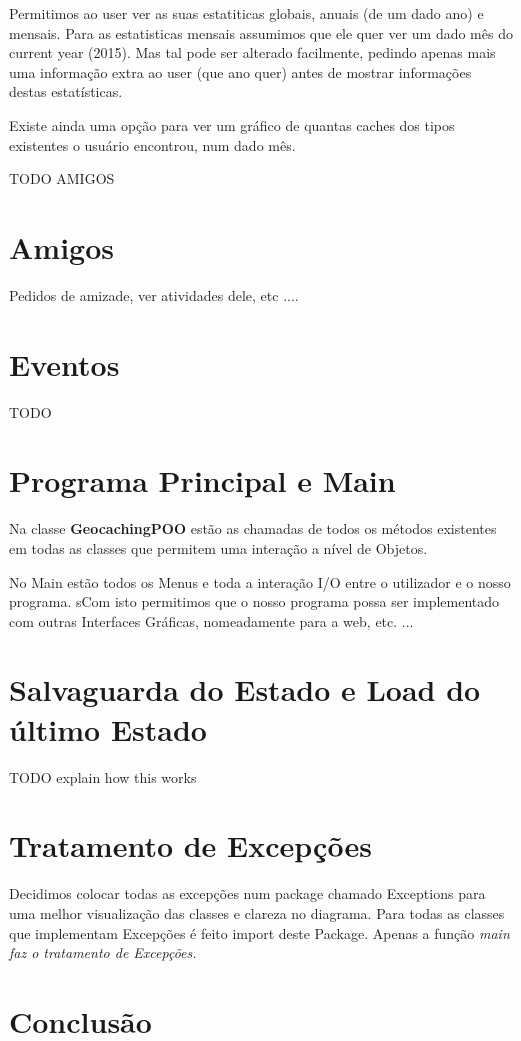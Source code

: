 \documentclass{article}
\begin{document}
\par Permitimos ao user ver as suas estatiticas globais, anuais (de um dado ano) e mensais. Para as estatisticas mensais assumimos que ele quer ver um dado mês do current year (2015). Mas tal pode ser alterado facilmente, pedindo apenas mais uma informação extra ao user (que ano quer) antes de mostrar informações destas estatísticas.

\par Existe ainda uma opção para ver um gráfico de quantas caches dos tipos existentes o usuário encontrou, num dado mês.




\pagebreak
TODO AMIGOS
\section{Amigos}
Pedidos de amizade, ver atividades dele, etc ....



\pagebreak
\section{Eventos}
TODO










\pagebreak
\section{Programa Principal e Main}
\quad Na classe \textbf{GeocachingPOO} estão as chamadas de todos os métodos existentes em todas as classes que 
permitem uma interação a nível de Objetos.

\par No Main estão todos os Menus e toda a interação I/O entre o utilizador e o nosso programa. sCom isto permitimos que o nosso programa possa ser implementado com outras Interfaces Gráficas, nomeadamente para a 
web, etc. ...




\pagebreak
\section{Salvaguarda do Estado e Load do último Estado}
TODO explain how this works




\pagebreak
\section{Tratamento de Excepções}
\quad Decidimos colocar todas as excepções num package chamado Exceptions para uma melhor visualização das classes e 
clareza no diagrama. Para todas as classes que implementam Excepções é feito import deste Package. Apenas a função 
\em main faz o tratamento de Excepções.
\pagebreak
\section{Conclusão}
\end{document}
